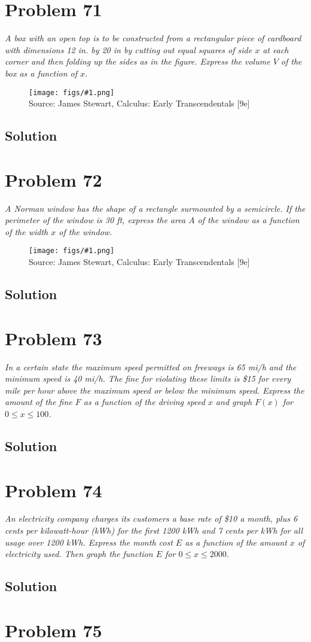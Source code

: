 \documentclass[11pt]{article}
\newcommand{\soln}{\subsection*}
\newcommand{\qn}{\textit}
\newcommand{\imagesource}[1]{{\footnotesize Source: #1}}
\newcommand{\imgqn}[1]{
	\begin{figure}[h]
		\centering
		\texttt{[image: figs/\#1.png]}\\
		\imagesource{James Stewart, Calculus: Early Transcendentals [9e]}
	\end{figure}
}
\begin{document}
\section*{Problem 71}

\qn{A box with an open top is to be constructed from a rectangular piece of cardboard with dimensions 12 in. by 20 in by cutting out equal squares of side $x$ at each corner and then folding up the sides as in the figure. Express the volume $V$ of the box as a function of $x$.}

\imgqn{1.1.71}

\soln{Solution}

\section*{Problem 72}

\qn{A Norman window has the shape of a rectangle surmounted by a semicircle. If the perimeter of the window is 30 ft, express the area $A$ of the window as a function of the width $x$ of the window.}

\imgqn{1.1.72}

\soln{Solution}

\section*{Problem 73}

\qn{In a certain state the maximum speed permitted on freeways is 65 mi/h and the minimum speed is 40 mi/h. The fine for violating these limits is \$15 for every mile per hour above the maximum speed or below the minimum speed. Express the amount of the fine $F$ as a function of the driving speed $x$ and graph $F(x)$ for $0 \le x \le 100$.}

\soln{Solution}

\section*{Problem 74}

\qn{An electricity company charges its customers a base rate of \$10 a month, plus 6 cents per kilowatt-hour (kWh) for the first 1200 kWh and 7 cents per kWh for all usage over 1200 kWh. Express the month cost $E$ as a function of the amount $x$ of electricity used. Then graph the function $E$ for $0 \le x \le 2000$.}

\soln{Solution}

\section*{Problem 75}
\end{document}
